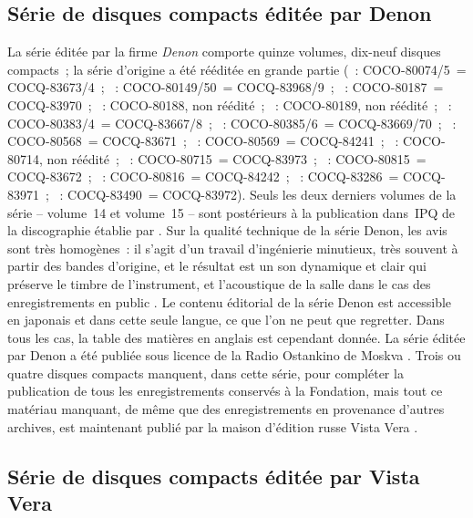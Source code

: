 \subsection{Série de disques compacts éditée par Denon}

La série éditée par la firme \emph{Denon} \citep[voir][]{Denon03, Denon05,
Denon06, Graham} comporte quinze volumes, dix-neuf disques compacts~; la
série d'origine a été rééditée en grande partie (~: COCO-80074/5~=
COCQ-83673/4~; ~: COCO-80149/50~= COCQ-83968/9~; ~:
COCO-80187~= COCQ-83970~; ~: COCO-80188, non réédité~;
~: COCO-80189, non réédité~; ~: COCO-80383/4~=
COCQ-83667/8~; ~: COCO-80385/6~= COCQ-83669/70~; ~:
COCO-80568~= COCQ-83671~; ~: COCO-80569~= COCQ-84241~;
~: COCO-80714, non réédité~; ~: COCO-80715~=
COCQ-83973~; ~: COCO-80815~= COCQ-83672~; ~:
COCO-80816~= COCQ-84242~; ~: COCQ-83286~= COCQ-83971~;
~: COCQ-83490~= COCQ-83972).
Seuls les deux derniers volumes de la série -- volume~14 et volume~15 --
sont postérieurs à la publication dans~IPQ de la discographie établie par
\FMalik{} \citep[voir][]{Malik}.
Sur la qualité technique de la série Denon, les avis sont très homogènes~:
il s'agit d'un travail d'ingénierie minutieux, très souvent à partir des
bandes d'origine, et le résultat est un son dynamique et clair qui préserve
le timbre de l'instrument, et l'acoustique de la salle dans le cas des
enregistrements en public \citep[voir][p.~62]{Juban}.
Le contenu éditorial de la série Denon est accessible en japonais et dans
cette seule langue, ce que l'on ne peut que regretter.
Dans tous les cas, la table des matières en anglais est cependant donnée.
La série éditée par Denon a été publiée sous licence de la Radio Ostankino
de Moskva \citep[voir][p.~11]{Nikonovich11}.
Trois ou quatre disques compacts manquent, dans cette série, pour compléter
la publication de tous les enregistrements conservés à la Fondation, mais
tout ce matériau manquant, de même que des enregistrements en provenance
d'autres archives, est maintenant publié par la maison d'édition russe Vista
Vera \citep[voir][p.~11]{Nikonovich11}.

\subsection{Série de disques compacts éditée par Vista Vera}

